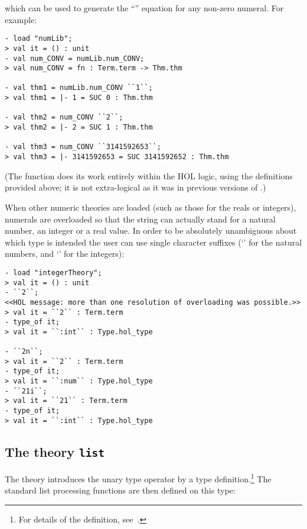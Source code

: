 \noindent which can be used to generate the ``'' equation for any
non-zero numeral.  For example:

\setcounter{sessioncount}{1}
\begin{session}\begin{verbatim}
- load "numLib";
> val it = () : unit
- val num_CONV = numLib.num_CONV;
> val num_CONV = fn : Term.term -> Thm.thm

- val thm1 = numLib.num_CONV ``1``;
> val thm1 = |- 1 = SUC 0 : Thm.thm

- val thm2 = num_CONV ``2``;
> val thm2 = |- 2 = SUC 1 : Thm.thm

- val thm3 = num_CONV ``3141592653``;
> val thm3 = |- 3141592653 = SUC 3141592652 : Thm.thm
\end{verbatim}\end{session}

\noindent (The  function does its work entirely within
the HOL logic, using the definitions provided above; it is not
extra-logical as it was in previous versions of \HOL{}.)

When other numeric theories are loaded (such as those for the reals or
integers), numerals are overloaded so that the string  can
actually stand for a natural number, an integer or a real value.  In
order to be absolutely unambiguous about which type is intended the
user can use single character suffixes (`' for the natural
numbers, and `' for the integers):

\begin{session}
\begin{verbatim}
- load "integerTheory";
> val it = () : unit
- ``2``;
<<HOL message: more than one resolution of overloading was possible.>>
> val it = ``2`` : Term.term
- type_of it;
> val it = ``:int`` : Type.hol_type

- ``2n``;
> val it = ``2`` : Term.term
- type_of it;
> val it = ``:num`` : Type.hol_type
- ``21i``;
> val it = ``21`` : Term.term
- type_of it;
> val it = ``:int`` : Type.hol_type
\end{verbatim}\end{session}


\subsection{The theory {\tt list}}\label{avra_list}

The theory  introduces the unary type operator  by a type
definition.\footnote{For details of the definition,
see~\cite{HOL-paper,Melham-banff}.}  The standard list processing functions
are then defined on this type:

